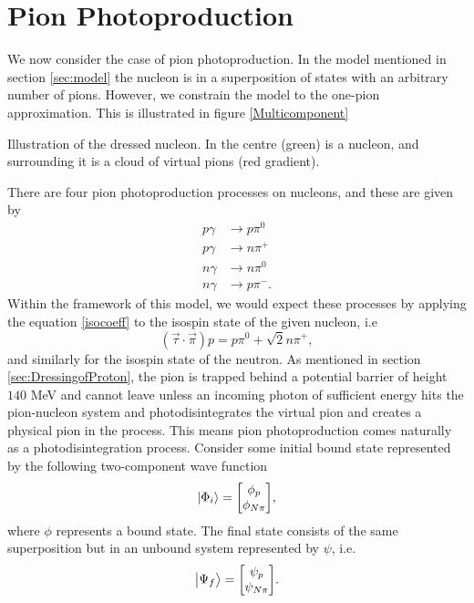 \chapter{Pion Photoproduction}\label{sec:PionPhotoproduction}
We now consider the case of pion photoproduction. In the model mentioned in section \ref{sec:model} the nucleon is in a superposition of states with an arbitrary number of pions. However, we constrain the model to the one-pion approximation. This is illustrated in figure \ref{Multicomponent}
\begin{marginfigure}
	\centering
	
	\caption{Illustration of the dressed nucleon. In the centre (green) is a nucleon, and surrounding it is a cloud of virtual pions (red gradient). }
	\label{Multicomponent}
\end{marginfigure}
There are four pion photoproduction processes on nucleons, and these are given by
\begin{align}
	p \gamma & \rightarrow p \pi^0 \label{photonew1}\\
	p \gamma & \rightarrow n \pi^+ \label{photonew2}\\
	n \gamma & \rightarrow n \pi^0 \label{photonew3}\\
	n \gamma & \rightarrow p \pi^- \label{photonew4}.
\end{align}
Within the framework of this model, we would expect these processes by applying the equation \eqref{isocoeff} to the isospin state of the given nucleon, i.e
\begin{equation} \label{isovectorex}
	(\vec{\tau}\cdot\vec{\pi}) p = p\pi^0 + \sqrt{2}n\pi^+,
\end{equation}
and similarly for the isospin state of the neutron. As mentioned in section \ref{sec:DressingofProton}, the pion is trapped behind a potential barrier of height $140$ MeV and cannot leave unless an incoming photon of sufficient energy hits the pion-nucleon system and photodisintegrates the virtual pion and creates a physical pion in the process. This means pion photoproduction comes naturally as a photodisintegration process. Consider some initial bound state represented by the following two-component wave function
\begin{equation} \label{phii}
	\ket{\Phi_i} = \mqty[\phi_p \\ \phi_{N\pi}],
\end{equation}
where $\phi$ represents a bound state. The final state consists of the same superposition but in an unbound system represented by $\psi$, i.e.
\begin{equation} \label{psif}
	\ket{\Psi_f} = \mqty[\psi_p \\ \psi_{N\pi}].
\end{equation}
